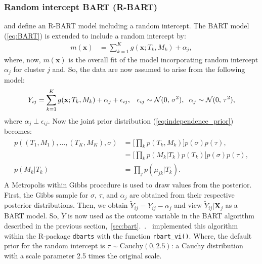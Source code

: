 \documentclass[10pt, a4paper, titlepage]{article}
\begin{document}
\subsubsection{Random intercept BART (R-BART)}
\citet{wagner2020,tan2016} and \citet{dorie2024} define an R-BART model including a random intercept. The BART model (\ref{eq:BART}) is extended to include a random intercept by: 
\begin{align} 
    \label{eq:R-BART}
    m(\textbf{x}) &= \sum^{K}_{k=1}g(\textbf{x}; T_{k}, M_{k}) + \alpha_{j}, 
\end{align} where, now, $m(\textbf{x})$ is the overall fit of the model incorporating random intercept $\alpha_{j}$ for cluster $j$ and. So, the data are now assumed to arise from the following model: 
\begin{align}
    \label{eq:R-BART_model}
    Y_{ij} = \sum^{K}_{k=1}g(\textbf{x}; T_{k}, M_{k}) + \alpha_j + \epsilon_{ij}, & &\epsilon_{ij} \sim \mathcal{N}(0,\,\sigma^{2}), \hspace{.2cm} \alpha_{j} \sim \mathcal{N}(0,\,\tau^{2}),
\end{align} where $\alpha_j \perp \epsilon_{ij}$. Now the joint prior distribution (\ref{eq:independence_prior}) becomes: 
\begin{align}
\begin{split}
    \label{eq:indepdence_prior_rbart}
    p((T_1, M_1), \dots, (T_K, M_K), \sigma) &= \Big[\prod_{k}p(T_k, M_k)\Big]p(\sigma)p(\tau), \\
    &= \Big[\prod_{k}p(M_k|T_k)p(T_k)\Big]p(\sigma)p(\tau), \\
    p(M_k|T_k) &= \prod_{j}p(\mu_{jk}|T_k).
\end{split}
\end{align} 
A Metropolis within Gibbs procedure is used to draw values from the posterior. First, the Gibbs sample for $\sigma$, $\tau$, and $\alpha_j$ are obtained from their respective posterior distributions. Then, we obtain $\tilde{Y}_{ij} = Y_{ij} - \alpha_{j}$ and view $\tilde{Y}_{ij}| \boldsymbol{X}_{j}$ as a BART model. So, $\tilde{Y}$ is now used as the outcome variable in the BART algorithm described in the previous section,~\ref{sec:bart}.~\citep{wagner2020,tan2016}.~\citet{dorie2024} implemented this algorithm within the R-package \texttt{dbarts} with the function \texttt{rbart\_vi()}. Where, the default prior for the random intercept is $\tau \sim \text{Cauchy}(0, 2.5)$: a Cauchy distribution with a scale parameter 2.5 times the original scale.
\end{document}

